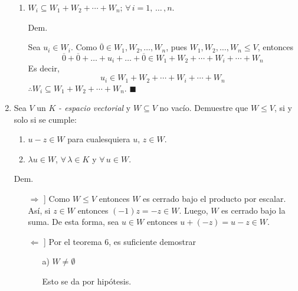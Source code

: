\documentclass[fleqn]{article}
\begin{document}
\begin{enumerate}
\begin{enumerate}
            \item $ W_i \subseteq W_1 + W_2 + \cdots + W_n; \, \forall \, i = 1,  \, \ldots \, , n $. \par
            \hspace{2.7mm}  Dem. \par

            Sea $ u_i \in W_i $. Como $ \overline{0} \in W_1, W_2, \ldots, W_n $, pues $ W_1, W_2, \ldots, W_n \leq V $, entonces
            \begin{equation*}
                \overline{0} + \overline{0} + \ldots + u_i + \ldots + \overline{0} \in W_1 + W_2 + \cdots + W_i + \cdots + W_n
            \end{equation*}
            Es decir,
            \begin{equation*}
                u_i \in W_1 + W_2 + \cdots + W_i + \cdots + W_n
            \end{equation*}
            $ \therefore W_i \subseteq W_1 + W_2 + \cdots + W_n $. $ \blacksquare $
        \end{enumerate}
        
        \item Sea $ V $ un $ K $ \textsl{- espacio vectorial} y $ W \subseteq V $ no vacío. Demuestre que $ W \leq V $, si y solo si se cumple:
        
        \begin{enumerate}
            \item $ u - z \in W $ para cualesquiera $ u, \, z \in W $.
            
            \item $ \lambda u \in W $, $ \forall \, \lambda \in K $ y $ \forall \, u \in W $.
        \end{enumerate}
        \hspace{2.7mm}  Dem. \par
        \begin{enumerate}
            \item[$ \Longrightarrow $]] Como $ W \leq V $ entonces $ W $ es cerrado bajo el producto por escalar. Así, si $ z\in W $ entonces $ (-1)z = -z \in W $. Luego, $ W $ es cerrado bajo la suma. De esta forma, sea $ u \in W $ entonces $ u + (-z) = u - z \in W $. \par
            \item[$ \Longleftarrow $]] Por el teorema 6, es suficiente demostrar
            \begin{enumerate}
                \item[a)] $ W \neq \emptyset $ \par
                Esto se da por hipótesis.


\end{enumerate}
\end{enumerate}
\end{enumerate}
\end{document}
